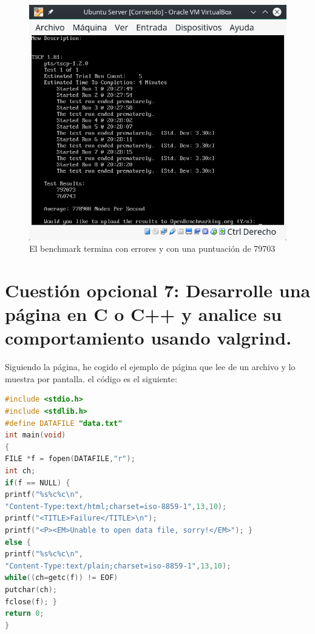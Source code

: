 \begin{figure}[H] %
	\centering
	\includegraphics[scale=0.5]{figuras/figura21.png}  %
	
	
	\caption{El benchmark termina con errores y con una puntuación de 79703}
	\label{figura21}
\end{figure}


\section{Cuestión opcional 7: Desarrolle una página en C o C++ y analice su comportamiento usando valgrind.}

Siguiendo la  página, he cogido el ejemplo de página que lee de un archivo y lo muestra por pantalla. el código es el siguiente:

\begin{lstlisting}[language=C]
#include <stdio.h>
#include <stdlib.h>
#define DATAFILE "data.txt"
int main(void)
{
FILE *f = fopen(DATAFILE,"r");
int ch;
if(f == NULL) {
printf("%s%c%c\n",
"Content-Type:text/html;charset=iso-8859-1",13,10);
printf("<TITLE>Failure</TITLE>\n");
printf("<P><EM>Unable to open data file, sorry!</EM>"); }
else {
printf("%s%c%c\n",
"Content-Type:text/plain;charset=iso-8859-1",13,10);
while((ch=getc(f)) != EOF)
putchar(ch);
fclose(f); }
return 0;
}

\end{lstlisting}

